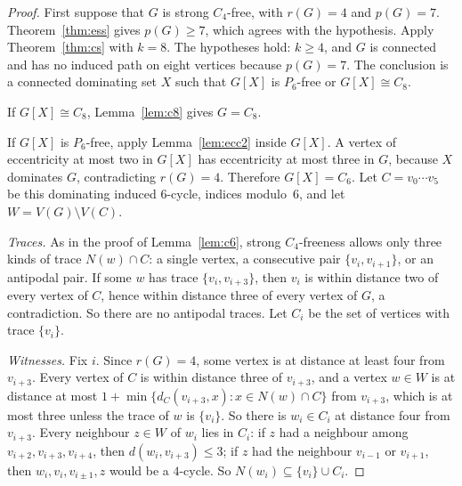 \documentclass[ASNA]{USG}
\theoremstyle{WBstyletwo}
\numberwithin{equation}{section}
\newcommand{\pp}{p}
\begin{document}
\begin{proof}
First suppose that $G$ is strong $C_4$-free, with $r(G)=4$ and $\pp(G)=7$. Theorem~\ref{thm:ess} gives $\pp(G)\ge 7$, which agrees with the hypothesis. Apply Theorem~\ref{thm:cs} with $k=8$. The hypotheses hold: $k\ge 4$, and $G$ is connected and has no induced path on eight vertices because $\pp(G)=7$. The conclusion is a connected dominating set $X$ such that $G[X]$ is $P_6$-free or $G[X]\cong C_8$.

If $G[X]\cong C_8$, Lemma~\ref{lem:c8} gives $G=C_8$.

If $G[X]$ is $P_6$-free, apply Lemma~\ref{lem:ecc2} inside $G[X]$. A vertex of eccentricity at most two in $G[X]$ has eccentricity at most three in $G$, because $X$ dominates $G$, contradicting $r(G)=4$. Therefore $G[X]=C_6$. Let $C=v_0\cdots v_5$ be this dominating induced $6$-cycle, indices modulo~$6$, and let $W=V(G)\setminus V(C)$.

\emph{Traces.} As in the proof of Lemma~\ref{lem:c6}, strong $C_4$-freeness allows only three kinds of trace $N(w)\cap C$: a single vertex, a consecutive pair $\{v_i,v_{i+1}\}$, or an antipodal pair. If some $w$ has trace $\{v_i,v_{i+3}\}$, then $v_i$ is within distance two of every vertex of $C$, hence within distance three of every vertex of $G$, a contradiction. So there are no antipodal traces. Let $C_i$ be the set of vertices with trace $\{v_i\}$.

\emph{Witnesses.} Fix $i$. Since $r(G)=4$, some vertex is at distance at least four from $v_{i+3}$. Every vertex of $C$ is within distance three of $v_{i+3}$, and a vertex $w\in W$ is at distance at most $1+\min\{d_C(v_{i+3},x):x\in N(w)\cap C\}$ from $v_{i+3}$, which is at most three unless the trace of $w$ is $\{v_i\}$. So there is $w_i\in C_i$ at distance four from $v_{i+3}$. Every neighbour $z\in W$ of $w_i$ lies in $C_i$: if $z$ had a neighbour among $v_{i+2},v_{i+3},v_{i+4}$, then $d(w_i,v_{i+3})\le 3$; if $z$ had the neighbour $v_{i-1}$ or $v_{i+1}$, then $w_i,v_i,v_{i\pm 1},z$ would be a $4$-cycle. So $N(w_i)\subseteq\{v_i\}\cup C_i$.


\end{proof}
\end{document}
